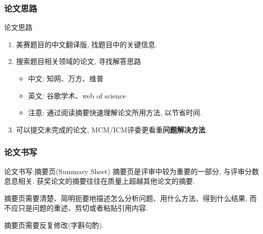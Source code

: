 \documentclass{ctexbeamer}
\begin{document}
\subsubsection{论文思路} %
\label{ssub:论文思路}

\begin{frame}{论文思路}
	\begin{enumerate}
		\item 美赛题目的中文翻译版, 找题目中的关键信息.
		\item 搜索题目相关领域的论文, 寻找解答思路
		      \begin{itemize}
			      \item 中文: 知网、万方、维普
			      \item 英文: 谷歌学术、web of science
			      \item \alert{注意}: 通过阅读摘要快速理解论文所用方法, 以节省时间.
		      \end{itemize}
		\item 可以提交未完成的论文, MCM/ICM评委更看重\textbf{问题解决方法}.
	\end{enumerate}

\end{frame}

\subsubsection{论文书写} %
\label{ssub:论文书写}

\begin{frame}{论文书写:\alert{摘要页(Summary Sheet)}}
	摘要页是评审中较为重要的一部分, 与评审分数息息相关. 获奖论文的摘要往往在质量上超越其他论文的摘要.

	\vspace{7pt}
	摘要页需要清楚、简明扼要地描述\alert{怎么分析问题、用什么方法、得到什么结果}, 而不应只是问题的重述、剪切或者粘贴引用内容.

	\vspace{7pt}
	摘要页需要反复修改(字斟句酌).
\end{frame}
\end{document}
